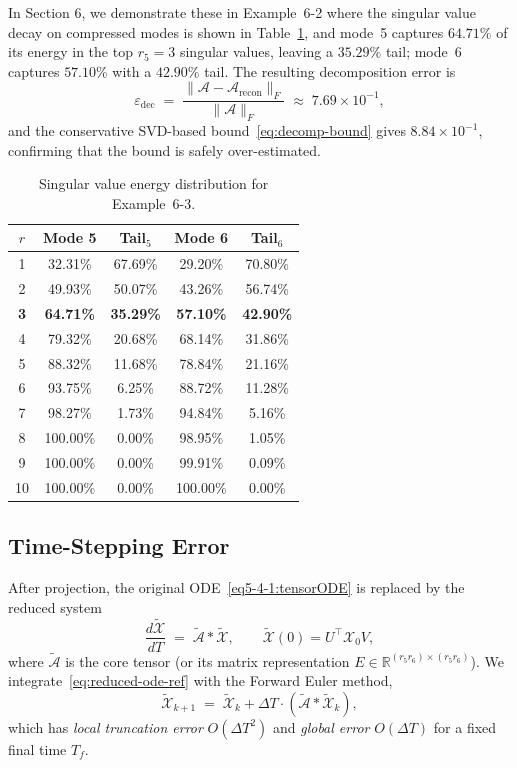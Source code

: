 \documentclass[11pt, oneside]{article}  %
\newcommand{\norm}[1]{\parallel\! #1\! \parallel}
\newcommand{\varp}{\varepsilon}
\newcommand{\RR}{\mathbb{R}}
\newcommand{\A}{\mathcal{A}}
\newcommand{\X}{\mathcal{X}}
\newcommand{\beq}{\begin{equation}}
\newcommand{\eeq}{\end{equation}}
\begin{document}
In Section 6, we demonstrate these in Example~6-2 where the singular value decay on compressed modes is shown in Table~\ref{tab:sv-decay}, and mode~5 captures $64.71\%$ of its energy in the top $r_5=3$ singular values, leaving a $35.29\%$ tail; mode~6 captures $57.10\%$ with a $42.90\%$ tail. The resulting decomposition error is
\[
\varp_{\text{dec}}\;=\;\frac{\norm{\A-\A_{\text{recon}}}_F}{\norm{\A}_F}\;\approx\; 7.69\times 10^{-1},
\]
and the conservative SVD-based bound~\eqref{eq:decomp-bound} gives $8.84\times 10^{-1}$, confirming that the bound is safely over-estimated.

\begin{table}[h]
\centering
\caption{Singular value energy distribution for Example~6-3.}
\label{tab:sv-decay}
\begin{tabular}{c|cc|cc}
\hline
$r$ & Mode 5 & Tail$_5$ & Mode 6 & Tail$_6$ \\
\hline
1 & 32.31\% & 67.69\% & 29.20\% & 70.80\% \\
2 & 49.93\% & 50.07\% & 43.26\% & 56.74\% \\
\textbf{3} & \textbf{64.71\%} & \textbf{35.29\%} & \textbf{57.10\%} & \textbf{42.90\%} \\
4 & 79.32\% & 20.68\% & 68.14\% & 31.86\% \\
5 & 88.32\% & 11.68\% & 78.84\% & 21.16\% \\
6 & 93.75\% &  6.25\% & 88.72\% & 11.28\% \\
7 & 98.27\% &  1.73\% & 94.84\% &  5.16\% \\
8 &100.00\% &  0.00\% & 98.95\% &  1.05\% \\
9 &100.00\% &  0.00\% & 99.91\% &  0.09\% \\
10&100.00\% &  0.00\% &100.00\% &  0.00\% \\
\hline
\end{tabular}
\end{table}

\subsection{Time-Stepping Error}
\label{sec7-2:timestepping}

After projection, the original ODE~\eqref{eq5-4-1:tensorODE} is replaced by
the reduced system
\beq\label{eq:reduced-ode-ref}
\frac{d\tilde{\X}}{dT}
\;=\;
\tilde{\A} \ast \tilde{\X},
\qquad
\tilde{\X}(0)=U^{\top}\X_0 V,
\eeq
where $\tilde{\A}$ is the core tensor (or its matrix representation
$E\in\RR^{(r_5r_6)\times(r_5r_6)}$).
We integrate~\eqref{eq:reduced-ode-ref} with the Forward Euler method,
\beq\label{eq:fe}
\tilde{\X}_{k+1}
\;=\;
\tilde{\X}_k + \Delta T \cdot (\tilde{\A}\ast\tilde{\X}_k),
\eeq
which has \emph{local truncation error} $O(\Delta T^2)$ and
\emph{global error} $O(\Delta T)$ for a fixed final time $T_f$.
\end{document}
